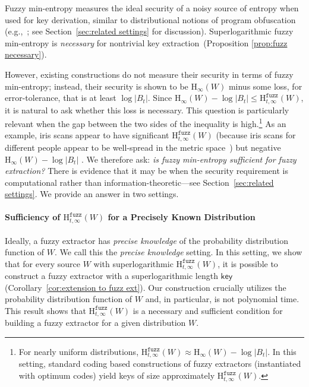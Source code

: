 \documentclass[11pt]{article}
\newcommand{\secref}[1]{\mbox{Section~\ref{#1}}}
\newcommand{\corref}[1]{\mbox{Corollary~\ref{#1}}}
\newcommand{\class}[1]{{\ensuremath{\mathsf{#1}}}}
\newcommand{\key}{\ensuremath{\class{key}}\xspace}
\newcommand{\Hoo}{\mathrm{H}_\infty}
\newcommand{\Hfuzz}{\mathrm{H}^{\mathtt{fuzz}}_{t,\infty}}
\begin{document}
Fuzzy min-entropy measures the ideal security of a noisy source of
entropy when used for key derivation, similar to distributional
notions of program obfuscation
(e.g.,~\cite{barak2001possibility,DBLP:conf/stoc/DodisS05,DBLP:conf/tcc/DodisS05};
see \secref{sec:related settings} for discussion).  Superlogarithmic fuzzy min-entropy is \emph{necessary} for nontrivial key extraction~(Proposition \ref{prop:fuzz necessary}).  

However, existing constructions do not measure their security in terms
of fuzzy min-entropy; instead, their security is shown to be
$\Hoo(W)$ minus some loss, for error-tolerance, that is at least $\log |B_t|$. Since $\Hoo(W)-\log |B_t| \le \Hfuzz(W)$, it is natural to ask whether this loss is necessary. This question is particularly relevant when the gap between the two sides of the inequality is high.\footnote{For nearly uniform distributions, $\Hfuzz(W) \approx \Hoo(W)- \log |B_t|$.  In this setting, standard coding based constructions of fuzzy extractors (instantiated with optimum codes) yield keys of size approximately $\Hfuzz(W)$.}  As an example, iris scans appear to have significant $\Hfuzz(W)$ (because iris scans for different people appear to be well-spread in the metric space~\cite{daugman2006probing}) but negative $\Hoo(W) -\log |B_t|$ \cite[Section 5]{blanton2009biometric}. We therefore ask: \emph{is fuzzy min-entropy sufficient for fuzzy extraction?} There is evidence that it may be when the security requirement is computational rather than information-theoretic---see \secref{sec:related settings}. We provide an answer in two settings.

\paragraph{Sufficiency of $\Hfuzz(W)$ for a Precisely Known Distribution}
Ideally, a fuzzy extractor has \emph{precise knowledge} of the
probability distribution function of $W$.  We call this  the
\emph{precise knowledge} setting.  In this setting, we show that for
every source $W$ with superlogarithmic $\Hfuzz(W)$, it is possible to
construct a fuzzy extractor with a superlogarithmic length $\key$
(\corref{cor:extension to fuzz ext}). Our construction crucially
utilizes the probability distribution function of $W$ and, in
particular, is not polynomial time.  This result shows that
$\Hfuzz(W)$ is a necessary and sufficient condition for building a
fuzzy extractor for a given distribution $W$.  
\end{document}
